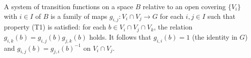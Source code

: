 A system of transition functions on a space $B$ relative to an open covering $\{V_i\}$ with $i \in I$ of $B$ is a family of maps $g_{i,j}: V_i \cap V_j \rightarrow G$ for each $i, j \in I$ such that property (T1) is satisfied: for each $b \in V_i \cap V_j \cap V_k$, the relation $g_{i,k}(b) = g_{i,j}(b)g_{j,k}(b)$ holds. It follows that $g_{i,i}(b) = 1$ (the identity in $G$) and $g_{i,j}(b) = g_{j,i}(b)^{-1}$ on $V_i \cap V_j$.
